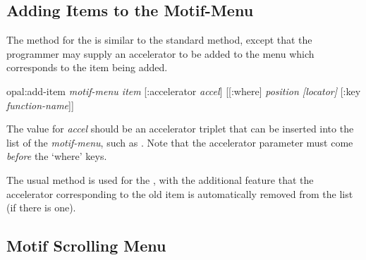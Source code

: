\subsection{Adding Items to the Motif-Menu}

The  method for the  is similar to the standard
method, except that the programmer may supply an accelerator to be added
to the menu which corresponds to the item being added.

\begin{programexample}
opal:add-item {\it motif-menu item} [:accelerator {\it accel}] [[:where] {\it position [locator]} [:key {\it function-name}]]
\end{programexample}

The value for {\it accel} should be an accelerator triplet that can be
inserted into the  list of the {\it motif-menu}, such as
.
Note that the accelerator parameter must come {\it before} the `where' keys.

The usual  method is used for the , with the
additional feature that the accelerator corresponding to the old item is
automatically removed from the  list (if there is one).


\begin{group}
\section{Motif Scrolling Menu}
\label{motif-scrolling-menu}

\begin{center}
\end{center}
\end{group}

